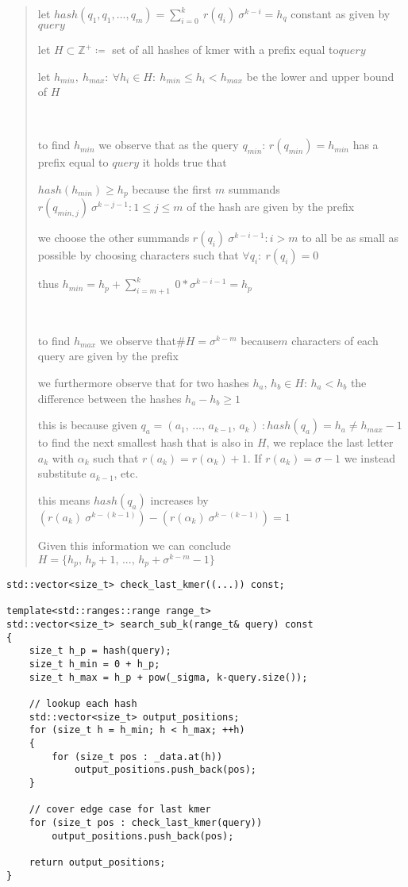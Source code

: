 \begin{verse}
let $hash(q_{1},q_{1},...,q_{m})=\sum_{i=0}^{k}\:r(q_{i})\:\sigma^{k-i}=h_{q}$
constant as given by $query$

let $H\subset\mathbb{Z}^{+}\coloneqq$ set of all hashes of kmer with
a prefix equal to$query$

let $h_{min},\:h_{max}:\:\forall h_{i}\in H:\:h_{min}\leq h_{i}<h_{max}$
be the lower and upper bound of $H$

~

to find $h_{min}$ we observe that as the query $q_{min}:\,r(q_{min})=h_{min}$
has a prefix equal to $query$ it holds true that

$hash(h_{min})\geq h_{p}$ because the first $m$ summands$r(q_{min,j})\:\sigma^{k-j-1}:1\leq j\leq m$
of the hash are given by the prefix

we choose the other summands $r(q_{i})\:\sigma^{k-i-1}:i>m$ to all
be as small as possible by choosing characters such that $\forall q_{i}:\:r(q_{i})=0$

thus $h_{min}=h_{p}+\sum_{i=m+1}^{k}\:0*\sigma^{k-i-1}=h_{p}$

~

to find $h_{max}$ we observe that$\#H=\sigma^{k-m}$ because$m$ characters
of each query are given by the prefix

we furthermore observe that for two hashes $h_{a},\,h_{b}\in H:\,h_{a}<h_{b}$ the
difference between the hashes $h_{a}-h_{b}\geq1$

this is because given $q_{a}=(a_{1},\,...,\,a_{k-1},\,a_{k})\::hash(q_{a})=h_{a}\neq h_{max}-1$
to find the next smallest hash that is also in $H$, we replace the
last letter $a_{k}$ with $\alpha_{k}$ such that $r(a_{k})=r(\alpha_{k})+1$.
If $r(a_{k})=\sigma-1$ we instead substitute $a_{k-1}$, etc.

this means $hash(q_{a})$ increases by $(r(a_{k})\:\sigma^{k-(k-1)})-(r(\alpha_{k})\:\sigma^{k-(k-1)})=1$

Given this information we can conclude $H=\{h_{p},\,h_{p}+1,\,...,\,h_{p}+\sigma^{k-m}-1\}$
\end{verse}

\begin{minipage}{\linewidth} %
\begin{lstlisting}[caption={Search function for queries of size 0 < m < k.},language={[GNU]C++},tabsize=2]
std::vector<size_t> check_last_kmer((...)) const;

template<std::ranges::range range_t>
std::vector<size_t> search_sub_k(range_t& query) const
{
	size_t h_p = hash(query);
	size_t h_min = 0 + h_p;
	size_t h_max = h_p + pow(_sigma, k-query.size());

	// lookup each hash
	std::vector<size_t> output_positions;
	for (size_t h = h_min; h < h_max; ++h)
	{
		for (size_t pos : _data.at(h))
			output_positions.push_back(pos);
	}

	// cover edge case for last kmer
	for (size_t pos : check_last_kmer(query))
		output_positions.push_back(pos);

	return output_positions;
}
\end{lstlisting}
\end{minipage}

